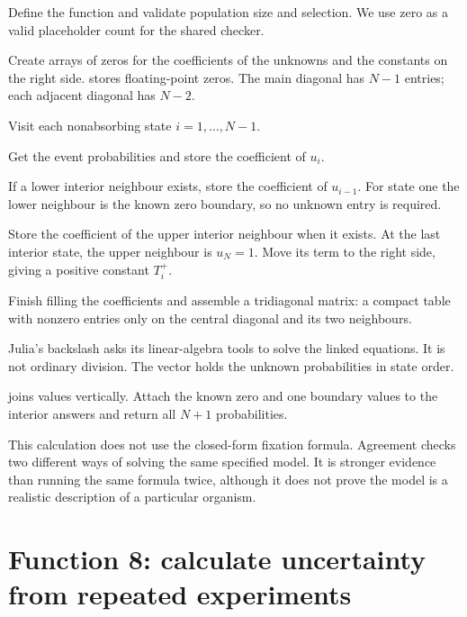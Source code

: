 \begin{description}[style=nextline]
\item[Lines 100--101] Define the function and validate population size and selection. We use zero as a valid placeholder count for the shared checker.
\item[Lines 102--105] Create arrays of zeros for the coefficients of the unknowns and the constants on the right side.  stores floating-point zeros. The main diagonal has \(N-1\) entries; each adjacent diagonal has \(N-2\).
\item[Line 106] Visit each nonabsorbing state \(i=1,\ldots,N-1\).
\item[Lines 107--108] Get the event probabilities and store the coefficient of \(u_i\).
\item[Lines 109--111] If a lower interior neighbour exists, store the coefficient of \(u_{i-1}\). For state one the lower neighbour is the known zero boundary, so no unknown entry is required.
\item[Lines 112--116] Store the coefficient of the upper interior neighbour when it exists. At the last interior state, the upper neighbour is \(u_N=1\). Move its term to the right side, giving a positive constant \(T_i^+\).
\item[Lines 117--118] Finish filling the coefficients and assemble a tridiagonal matrix: a compact table with nonzero entries only on the central diagonal and its two neighbours.
\item[Line 119] Julia's backslash asks its linear-algebra tools to solve the linked equations. It is not ordinary division. The vector  holds the unknown probabilities in state order.
\item[Lines 120--121]  joins values vertically. Attach the known zero and one boundary values to the interior answers and return all \(N+1\) probabilities.
\end{description}

This calculation does not use the closed-form fixation formula. Agreement checks two different ways of solving the same specified model. It is stronger evidence than running the same formula twice, although it does not prove the model is a realistic description of a particular organism.

\section{Function 8: calculate uncertainty from repeated experiments}


